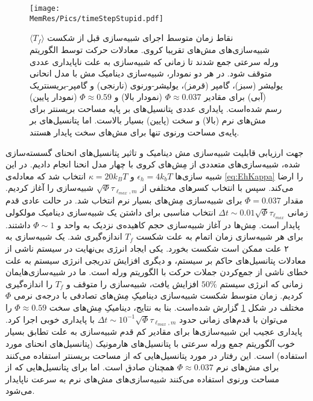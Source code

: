 \begin{figure}[tbp]
\begin{center}
\texttt{[image: \\MemRes/Pics/timeStepStupid.pdf]}
\caption{
نقاط زمان متوسط اجرای شبیه‌سازی قبل از شکست
$\langle T_f\rangle$
شبیه‌سازی‌های مش‌های تقریبا کروی. معادلات حرکت توسط الگوریتم ورله سرعتی جمع شدند تا زمانی که شبیه‌سازی به علت ناپایداری عددی متوقف شود. در هر دو نمودار، شبیه‌سازی دینامیک مش با مدل انحانی یولیشر (سبز)، گامپر (قرمز)، یولیشر-ورنوی (نارنجی) و گامپر-بریسنتریک (آبی) برای مقادیر 
$\Phi\approx0.037$ 
(نمودار بالا) و
$\Phi\approx0.59$ 
(نمودار پایین) رسم شده‌است. پایداری عددی پتانسیل‌های بر پایه مساحت بریسنتر برای مش‌های نرم (بالا) و سخت (پایین) بسیار بالاست. اما پتانسیل‌های بر پایه‌ی مساحت ورنوی تنها برای مش‌های سخت پایدار هستند.
}
\label{fig:timeSteps}
\end{center}
\end{figure}


جهت ارزیابی قابلیت شبیه‌سازی مش دینامیک و تاثیر پتانسیل‌های انحنای گسسته‌سازی شده، شبیه‌سازی‌های متعددی از مِش‌های کروی با چهار مدل انحنا انجام دادیم. در این شبیه سازی‌ها
$\epsilon_h=4k_bT$
و
$\kappa=20k_BT$
انتخاب شد که معادله‌ی
\ref{eq:EhKappa}
را ارضا می‌کند. سپس با انتخاب کسر‌های مختلفی از
 $\sqrt{\Phi}\tau_{\ell_{max},m}$
شبیه‌سازی را آغاز کردیم. مقدار
$\Phi=0.037$
برای شبیه‌سازی مِش‌های بسیار نرم انتخاب شد. در حالت عادی قدم زمانی
$\Delta t\sim0.01\sqrt{\Phi}\tau_{\ell_{max}}$
انتخاب مناسبی برای داشتن یک شبیه‌سازی دینامیک مولکولی پایدار است. مِش‌ها در آغاز شبیه‌سازی حجم کاهیده‌ی نزدیک به واحد و 
$\Phi\sim1$
داشتند. برای هر شبیه‌سازی زمان اتمام به علت شکست 
$T_f$
اندازه‌گیری شد. یک شبیه‌سازی به ۲ علت ممکن است شکست بخورد. یکی ایجاد انرژی بی‌نهایت در سیستم ناشی از معادلات پتانسیل‌های حاکم بر سیستم، و دیگری افزایش تدریجی انرژی سیستم به علت خطای ناشی از جمع‌کردن جملات حرکت با الگوریتم ورله است. ما در شبیه‌سازی‌هایمان زمانی که انرژی سیستم 
$50\%$
افزایش یافت، شبیه‌سازی را متوقف  و 
$T_f$
را اندازه‌گیری کردیم. زمان متوسط شکست شبیه‌سازی دینامیکِ مِش‌های تصادفی با درجه‌ی نرمی 
$\Phi$
مختلف در شکل
\ref{fig:timeSteps}
گزارش شده‌است. بنا به نتایج، دینامیکِ مِش‌های سخت 
$\Phi\approx 0.59$
را می‌توان با قدم‌های زمانی حدود
$\Delta t \sim10^{-1}\sqrt{\Phi}\tau_{\ell_{max},m}$
با پایداری خوبی اجرا کرد. پایداری عجیب این شبیه‌سازی‌ها برای مقادیر کم قدم شبیه‌سازی به علت تطابق بسیار خوب آلگوریتم جمع ورله سرعتی با پتانسیل‌های هارمونیک (پتانسیل‌های انحنای مورد استفاده) است. این رفتار در مورد پتانسیل‌هایی که از مساحت بریسنتر استفاده می‌کنند برای مش‌های نرم
$\Phi\approx 0.037$
همچنان صادق است. اما برای پتانسیل‌هایی که از مساحت ورنوی استفاده می‌کنند شبیه‌سازی‌های مش‌های نرم به سرعت ناپایدار می‌شود. 

